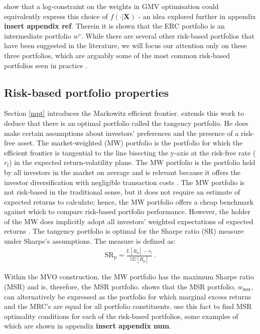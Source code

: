 \documentclass[
]{article}
\begin{document}
\citet{MRT10} show that a log-constraint on the weights in GMV optimisation could equivalently express this
choice of \(f(\cdot| \textbf{X})\) - an idea explored further in appendix \textbf{insert appendix ref}.
Therein it is shown that the ERC portfolio is an intermediate portfolio \(w^\diamond\). While there are
several other risk-based portfolios that have been suggested in the literature, we will focus our
attention only on these three portfolios, which are arguably some of the most common risk-based
portfolios seen in practice \citet{J13}.

\hypertarget{risk-based-portfolio-properties}{%
\subsection{Risk-based portfolio properties}\label{risk-based-portfolio-properties}}

Section \ref{mpt} introduces the Markowitz efficient frontier. \citet{S64} extends this work to deduce that
there is an optimal portfolio called the tangency portfolio. He does make certain assumptions about
investors' preferences and the presence of a risk-free asset. The market-weighted (MW) portfolio is the
portfolio for which the efficient frontier is tangential to the line bisecting the y-axis at the
risk-free rate (\(r_\mathrm{f}\)) in the expected return-volatility plane. The MW portfolio is the
portfolio held by all investors in the market on average and is relevant because it offers the investor
diversification with negligible transaction costs \citet{P07}. The MW portfolio is not risk-based in the
traditional sense, but it does not require an estimate of expected returns to calculate; hence, the MW
portfolio offers a cheap benchmark against which to compare risk-based portfolio performance. However,
the holder of the MW does implicitly adopt all investors' weighted expectations of expected returns
\citet{H91}. The tangency portfolio is optimal for the Sharpe ratio (SR) measure under Sharpe's
assumptions. The measure is defined as:
\begin{align}
\text{SR}_\mathrm{p} = \frac{\mathbb{E}[R_\mathrm{p}] - r_\mathrm{f}}{\mathbb{SD}[R_\mathrm{p}]} \;.
\end{align}

Within the MVO construction, the MW portfolio has the maximum Sharpe ratio (MSR) and is, therefore, the
MSR portfolio. \citet{S07} shows that the MSR portfolio, \(w_\mathrm{msr}\), can alternatively be expressed
as the portfolio for which marginal excess returns and the MRC's are equal for all portfolio
constituents. \citet{J13} use this fact to find MSR optimality conditions for each of the risk-based
portfolios, some examples of which are shown in appendix \textbf{insert appendix num}.
\end{document}
